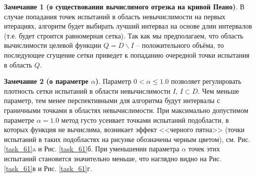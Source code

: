 \documentclass[a4paper,12pt,russian]{article}
\begin{document}

\textbf{Замечание 1 (о существовании вычислимого отрезка на кривой Пеано)}. В случае попадания точек испытаний в область невычислимости на первых итерациях, алгоритм будет выбирать лучший интервал на основе длин интервалов (т.е. будет строится равномерная сетка). Так как мы предполагаем, что область вычислимости целевой функции $Q = D \backslash I$ -- положительного объёма, то последующее сгущение сетки приведет к попаданию очередной точки испытания в область $Q$.


\textbf{Замечание 2 (о параметре $\alpha$)}. Параметр $0 < \alpha \leq 1.0$ позволяет регулировать плотность сетки испытаний в области невычислимости $I$, $I \subset D$. Чем меньше параметр, тем менее перспективными для алгоритма будут интервалы с граничными точками в областях невычислимости. При максимально допустимом параметре $\alpha = 1.0$ метод густо усеивает точками испытаний подобласти, в которых функция не вычислима, возникает эффект <<черного пятна>> (точки испытаний в таких подобластях на рисунке обозначены черным цветом), см. Рис. \ref{task_61}a и Рис. \ref{task_61}б. При уменьшении параметра $\alpha$ точек этих испытаний становится значительно меньше, что наглядно видно на Рис. \ref{task_61}в и Рис. \ref{task_61}г.
\end{document}
